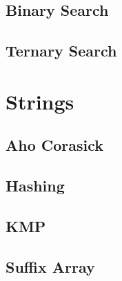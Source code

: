 \documentclass[twocolumn]{article}
\begin{document}
		\subsection{Binary Search}
		\subsection{Ternary Search}
		
	\section{Strings}
		\subsection{Aho Corasick}
		\subsection{Hashing}
		\subsection{KMP}
		\subsection{Suffix Array}
\end{document}
